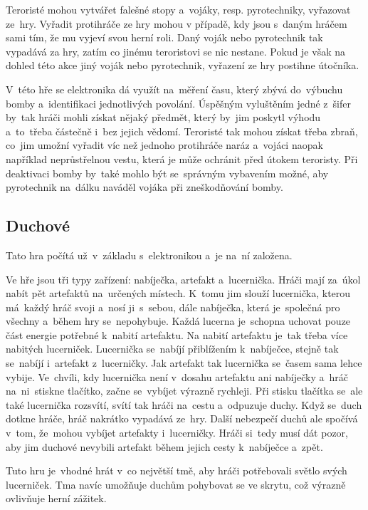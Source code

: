 Teroristé mohou vytvářet falešné stopy a~vojáky, resp. pyrotechniky, vyřazovat ze~hry.
Vyřadit protihráče ze hry mohou v případě, kdy jsou s~daným hráčem sami tím, že mu vyjeví svou herní roli.
Daný voják nebo pyrotechnik tak vypadává za hry, zatím co jinému teroristovi se nic nestane.
Pokud je však na dohled této akce jiný voják nebo pyrotechnik, vyřazení ze hry postihne útočníka.

V~této hře se elektronika dá využít na~měření času, který zbývá do~výbuchu bomby a~identifikaci jednotlivých povolání.
Úspěšným vyluštěním jedné z~šifer by~tak hráči mohli získat nějaký předmět, který by~jim poskytl výhodu a~to~třeba částečně i~bez jejich vědomí.
Teroristé tak mohou získat třeba zbraň, co~jim umožní vyřadit víc než jednoho protihráče naráz a~vojáci naopak například neprůstřelnou vestu, která je může ochránit před útokem teroristy.
Při deaktivaci bomby by~také mohlo být se~správným vybavením možné, aby pyrotechnik na~dálku naváděl vojáka při zneškodňování bomby.

\vspace{-2mm}
\subsection{Duchové}
Tato hra počítá už~v~základu s~elektronikou a~je na~ní založena.

Ve hře jsou tři typy zařízení: nabíječka, artefakt a~lucernička.
Hráči mají za~úkol nabít pět artefaktů na~určených místech.
K~tomu jim slouží lucernička, kterou má~každý hráč svoji a~nosí ji~s~sebou, dále nabíječka, která je~společná pro všechny a~během hry se~nepohybuje.
Každá lucerna je~schopna uchovat pouze část energie potřebné k~nabití artefaktu. 
Na nabití artefaktu je~tak třeba více nabitých lucerniček.
Lucernička se~nabíjí přiblížením k~nabíječce, stejně tak se~nabíjí i~artefakt z~lucerničky.
Jak artefakt tak lucernička se~časem sama lehce vybije.
Ve~chvíli, kdy lucernička není v~dosahu artefaktu ani nabíječky a~hráč na~ni~stiskne tlačítko, začne se~vybíjet výrazně rychleji.
Při stisku tlačítka se~ale také lucernička rozsvítí, svítí tak hráči na~cestu a~odpuzuje duchy.
Když se~duch dotkne hráče, hráč nakrátko vypadává ze~hry.
Další nebezpečí duchů ale spočívá v~tom, že~mohou vybíjet artefakty i~lucerničky.
Hráči si~tedy musí dát pozor, aby jim duchové nevybili artefakt během jejich cesty k~nabíječce a~zpět.


Tuto hru je~vhodné hrát v~co největší tmě, aby hráči potřebovali světlo svých lucerniček.
Tma navíc umožňuje duchům pohybovat se ve skrytu, což výrazně ovlivňuje herní zážitek.